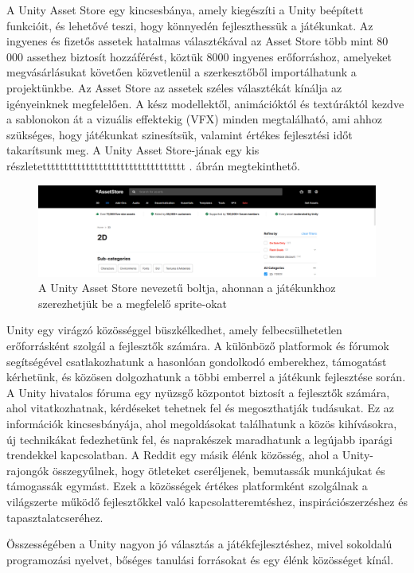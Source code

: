 A Unity Asset Store egy kincsesbánya, amely kiegészíti a Unity beépített funkcióit, és lehetővé teszi, hogy könnyedén fejleszthessük a játékunkat. Az ingyenes és fizetős assetek hatalmas választékával az Asset Store több mint 80 000 assethez biztosít hozzáférést, köztük 8000 ingyenes erőforráshoz, amelyeket megvásárlásukat követően közvetlenül a szerkesztőből importálhatunk a projektünkbe. Az Asset Store az assetek széles választékát kínálja az igényeinknek megfelelően. A kész modellektől, animációktól és textúráktól kezdve a sablonokon át a vizuális effektekig (VFX) minden megtalálható, ami ahhoz szükséges, hogy játékunkat szinesítsük, valamint értékes fejlesztési időt takarítsunk meg. \cite{unity2} A Unity Asset Store-jának egy kis részletettttttttttttttttttttttttttttttttt . ábrán megtekinthető.

\begin{figure}[ht]
\centering
\includegraphics[scale = 0.3]{images/unity_asset_store.png}
\caption{A Unity Asset Store nevezetű boltja, ahonnan a játékunkhoz szerezhetjük be a megfelelő sprite-okat \cite{unityassetstore}}
\label{fig:unityassetstore}
\end{figure}

Unity egy virágzó közösséggel büszkélkedhet, amely felbecsülhetetlen erőforrásként szolgál a fejlesztők számára. A különböző platformok és fórumok segítségével csatlakozhatunk a hasonlóan gondolkodó emberekhez, támogatást kérhetünk, és közösen dolgozhatunk a többi emberrel a játékunk fejlesztése során. A Unity hivatalos fóruma egy nyüzsgő központot biztosít a fejlesztők számára, ahol vitatkozhatnak, kérdéseket tehetnek fel és megoszthatják tudásukat. Ez az információk kincsesbányája, ahol megoldásokat találhatunk a közös kihívásokra, új technikákat fedezhetünk fel, és naprakészek maradhatunk a legújabb iparági trendekkel kapcsolatban. A Reddit egy másik élénk közösség, ahol a Unity-rajongók összegyűlnek, hogy ötleteket cseréljenek, bemutassák munkájukat és támogassák egymást. Ezek a közösségek értékes platformként szolgálnak a világszerte működő fejlesztőkkel való kapcsolatteremtéshez, inspirációszerzéshez és tapasztalatcseréhez.  \cite{unity2}

Összességében a Unity nagyon jó választás a játékfejlesztéshez, mivel sokoldalú programozási nyelvet, bőséges tanulási forrásokat és egy élénk közösséget kínál.
